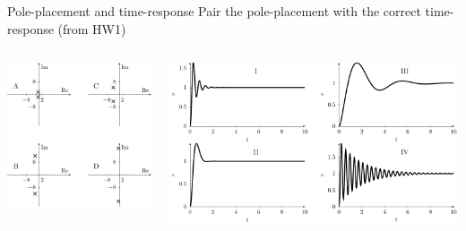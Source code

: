 \documentclass[presentation,aspectratio=169]{beamer}
\begin{document}
\begin{frame}[label=sec-2-1]{Pole-placement and time-response}
Pair the pole-placement with the correct time-response (from HW1)
\begin{columns}
\begin{column}{0.4\textwidth}
\begin{center}
\includegraphics[width=\linewidth]{../../figures/pzmap-apollo}
\end{center}
\end{column}
\begin{column}{0.6\textwidth}
\begin{center}
\includegraphics[width=\linewidth]{../../figures/step-response-apollo}
\end{center}
\end{column}
\end{columns}
\end{frame}
\end{document}
